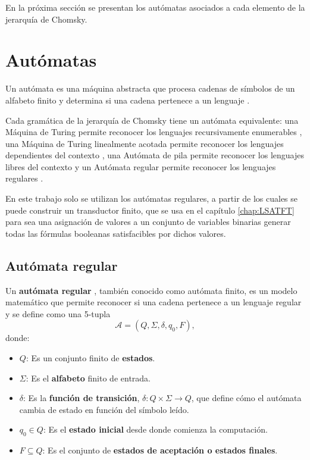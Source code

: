 En la próxima sección se presentan los autómatas asociados a cada elemento de la jerarquía de Chomsky.
\section{Autómatas}

Un autómata es una máquina abstracta que procesa cadenas de símbolos de un alfabeto finito y determina si una 
cadena pertenece a un lenguaje \cite{authomataTheory}.

Cada gramática de la jerarquía de Chomsky tiene un autómata equivalente: una Máquina de Turing permite reconocer 
los lenguajes recursivamente enumerables \cite{authomataTheory}, una Máquina de Turing linealmente acotada 
permite reconocer los lenguajes dependientes del contexto \cite{authomataTheory}, una Autómata de pila permite 
reconocer los lenguajes libres del contexto \cite{authomataTheory} y un Autómata regular permite reconocer los 
lenguajes regulares \cite{authomataTheory}.

En este trabajo solo se utilizan los autómatas regulares, a partir de los cuales se puede construir un transductor finito, 
que se usa en el capítulo \ref{chap:LSATFT} para sea una asignación de valores a un conjunto de variables binarias generar 
todas las fórmulas booleanas satisfacibles por dichos valores.

\subsection{Autómata regular}

\begin{definition}
  Un \textbf{autómata regular} \cite{authomataTheory}, también conocido como autómata finito, es un modelo matemático que permite reconocer si una cadena pertenece a un lenguaje regular y se define como una 5-tupla $$\mathcal{A} = (Q, \Sigma, \delta, q_0, F),$$ donde:
  
  \begin{itemize}
    \item $Q$: Es un conjunto finito de \textbf{estados}.
    \item $\Sigma$: Es el \textbf{alfabeto} finito de entrada.
    \item $\delta$: Es la \textbf{función de transición}, $\delta: Q \times \Sigma \to Q$, que define cómo el autómata cambia de estado en función del símbolo leído.
    \item $q_0 \in Q$: Es el \textbf{estado inicial} desde donde comienza la computación.
    \item $F \subseteq Q$: Es el conjunto de \textbf{estados de aceptación o estados finales}.
  \end{itemize}
\end{definition}


